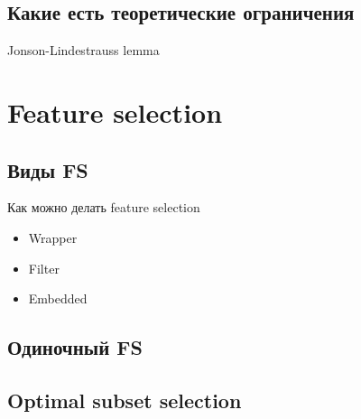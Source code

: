 \documentclass[14pt, fleqn, xcolor={dvipsnames, table}]{beamer}
\begin{document}
\subsection{Какие есть теоретические ограничения}
\begin{frame}{Jonson-Lindestrauss lemma}
\end{frame}

\section{Feature selection}
\subsection{Виды FS}
\begin{frame}{Как можно делать feature selection}
\begin{itemize}
  \item Wrapper
  \item Filter
  \item Embedded
\end{itemize}
\end{frame}

\subsection{Одиночный FS}

\subsection{Optimal subset selection}
\end{document}
